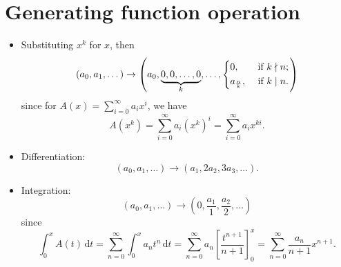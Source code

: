\section{Generating function operation}
\begin{itemize}
    \item Substituting \(x^k\) for \(x\), then 
    \[
        (a_0, a_1, \dots ) \to \left(a_0, \underbrace{0, 0, \dots , 0}_{k}, \dots, \begin{dcases}
            0 , &\text{ if } k \nmid n ;\\
            a_{\frac{n}{k}}, &\text{ if } k \mid n.
        \end{dcases}\right)
    \]
    since for \(A(x) = \sum_{i=0}^{\infty} a_i x^i \), we have 
    \[
        A \left( x^k \right) = \sum_{i=0}^{\infty} a_i \left( x^k \right)^i = \sum_{i=0}^{\infty} a_i x^{ki}.   
    \] 
    \item Differentiation: 
    \[
        (a_0, a_1, \dots) \to (a_1, 2 a_2, 3 a_3, \dots ).
    \]
    \item Integration: 
    \[
        (a_0, a_1, \dots ) \to \left( 0, \frac{a_1}{1}, \frac{a_2}{2}, \dots  \right) 
    \] since
    \[
        \int _0 ^x A(t) \, \mathrm{d} t = \sum_{n=0}^{\infty} \int _0 ^ x a_n t^n \, \mathrm{d} t = \sum_{n=0}^{\infty} a_n \left[ \frac{t^{n+1}}{n + 1} \right]_0 ^ x = \sum_{n=0}^{\infty} \frac{a_n}{n + 1} x^{n + 1}.      
    \]
\end{itemize}

